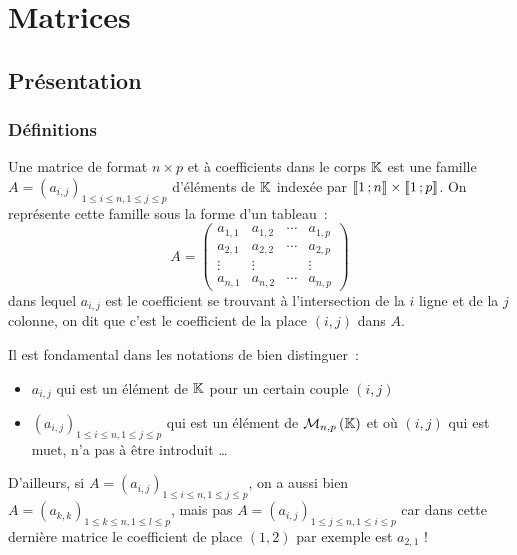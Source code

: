 \chapter{Matrices}
\label{chap:matrices}
\minitoc
\minilof
\minilot

\section{Présentation}
\label{chap1-sec:presentation}
\subsection{Définitions}
Une matrice de format $n \times p$ et à coefficients dans le corps $\mathbb{K}$ est une famille $A = (a_{i,j})_{1\leq i \leq n, 1 \leq j \leq p}$ d'éléments de $\mathbb{K}$ indexée par $\mathopen{\llbracket}1\mathclose{}\mathpunct{};n\mathclose{\rrbracket} \times \mathopen{\llbracket}1\mathclose{}\mathpunct{};p\mathclose{\rrbracket}$. On représente cette famille sous la forme d'un tableau~:
\begin{equation}
	A = \begin{pmatrix}
		a_{1,1} & a_{1,2} & \cdots & a_{1,p} \\
		a_{2,1} & a_{2,2} & \cdots & a_{2, p} \\
		\vdots & \vdots &  & \vdots \\
		a_{n,1} & a_{n,2} & \cdots & a_{n,p}
	\end{pmatrix}
\end{equation}
dans lequel $a_{i,j}$ est le coefficient se trouvant à l'intersection de la $i$\ieme{} ligne et de la $j$\ieme{} colonne, on dit que c'est le coefficient de la place $(i, j)$ dans $A$.

\begin{remarque}
	Il est fondamental dans les notations de bien distinguer~:
	\begin{itemize}
		\item $a_{i,j}$ qui est un élément de $\mathbb{K}$ pour un certain couple $(i, j)$
		\item $(a_{i,j})_{1\leq i \leq n, 1 \leq j \leq p}$ qui est un élément de $\mathcal{M}_{n,p}\left(\mathbb{K}\right)$ et où $(i, j)$ qui est muet, n'a pas à être introduit \dots{}
	\end{itemize}
\end{remarque}
D'ailleurs, si $A = (a_{i,j})_{1\leq i \leq n, 1 \leq j \leq p}$, on a aussi bien $A = (a_{k,k})_{1\leq k \leq n, 1 \leq l \leq p}$, mais pas $A = (a_{i,j})_{1\leq j \leq n, 1 \leq i \leq p}$ car dans cette dernière matrice le coefficient de place $(1,2)$ par exemple est $a_{2,1}$ !

